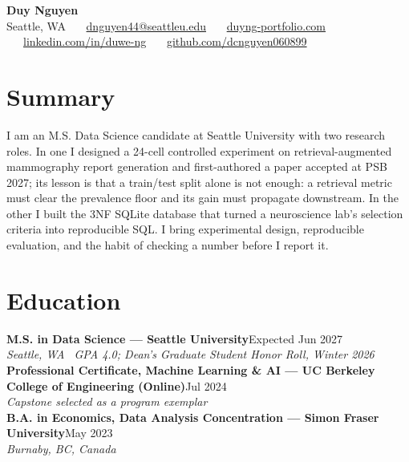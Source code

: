 \documentclass[letterpaper,10pt]{article}
\newcommand{\role}[3]{\vspace{1pt}\textbf{#1}\hfill #2\\[1pt]\textit{#3}\\[1pt]}
\begin{document}
\begin{center}
  {\LARGE\bfseries Duy Nguyen}\\[4pt]
  Seattle, WA \ \textbullet\ \ \href{mailto:dnguyen44@seattleu.edu}{dnguyen44@seattleu.edu} \ \textbullet\ \ \href{https://duyng-portfolio.com}{duyng-portfolio.com} \ \textbullet\ \ \href{https://linkedin.com/in/duwe-ng}{linkedin.com/in/duwe-ng} \ \textbullet\ \ \href{https://github.com/dcnguyen060899}{github.com/dcnguyen060899}
\end{center}

\section{Summary}
I am an M.S. Data Science candidate at Seattle University with two research roles. In one I designed a 24-cell controlled experiment on retrieval-augmented mammography report generation and first-authored a paper accepted at PSB 2027; its lesson is that a train/test split alone is not enough: a retrieval metric must clear the prevalence floor and its gain must propagate downstream. In the other I built the 3NF SQLite database that turned a neuroscience lab's selection criteria into reproducible SQL. I bring experimental design, reproducible evaluation, and the habit of checking a number before I report it.

\section{Education}
\role{M.S. in Data Science --- Seattle University}{Expected Jun 2027}{Seattle, WA \textbar\  GPA 4.0; Dean's Graduate Student Honor Roll, Winter 2026}
\vspace{-3pt}
\role{Professional Certificate, Machine Learning \& AI --- UC Berkeley College of Engineering (Online)}{Jul 2024}{Capstone selected as a program exemplar}
\vspace{-3pt}
\role{B.A. in Economics, Data Analysis Concentration --- Simon Fraser University}{May 2023}{Burnaby, BC, Canada}
\vspace{-3pt}

\end{document}

